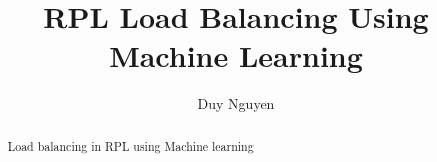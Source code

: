 \documentclass[11pt,a4paper,twoside,openright ]{report}
\title{RPL Load Balancing Using Machine Learning}
\author{Duy Nguyen}
\date{}
\begin{document}
\frontmatter



\begin{abstract}

    Load balancing in RPL using Machine learning

\end{abstract}


\maketitle



\tableofcontents{}



\mainmatter


\newcommand{\ieeemac}{IEEE~802.15.4}
\newcommand{\ieeemacE}{IEEE~802.15.4e}
\newcommand{\lowpan}{6LoWPAN}
\newcommand{\lowpanF}{IPv6 over Low-Power Wireless Personal Area Networks}
\newcommand{\dtree}{MLOF\_DTREE}
\newcommand{\lgbm}{MLOF\_LGBM}








\backmatter


%


\end{document}

